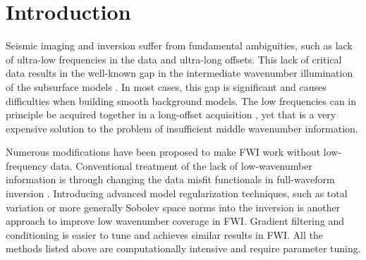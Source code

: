 \documentclass[paper,twocolomn]{geophysics}
\begin{document}
	






\section{Introduction}
Seismic imaging and inversion suffer from fundamental ambiguities, such as lack of ultra-low frequencies in the data and ultra-long offsets. This lack of critical data results in the well-known gap in the intermediate wavenumber illumination of the subsurface models \citep{claerbout1985, mora1989, sirgue2004, alkhalifahFullmodelWavenumberInversion2016, kazei2016, kazei2018, yao2019extraction}. In most cases, this gap is significant and causes difficulties when building smooth background models. The low frequencies can in principle be acquired together in a long-offset acquisition \citep[e.g.][]{fons2013}, yet that is a very expensive solution to the problem of insufficient middle wavenumber information.


Numerous modifications have been proposed to make FWI work without low-frequency data. %
Conventional treatment of the lack of low-wavenumber information is through changing the data misfit functionals in full-waveform inversion \citep[e.g.][]{luo1991wave, bozdag2011, choi2012, leeuwen2013, sun2019robust}.
Introducing advanced model regularization techniques, such as total variation or more generally Sobolev space norms \citep[e.g.][]{esserTotalvariationRegularizationStrategies2016, kazeiSaltbodyInversionMinimum2017, kalita2019regularized, skopintseva2019regularization} into the inversion is another approach to improve low wavenumber coverage in FWI.
Gradient filtering and conditioning \citep{ravaut2004multiscale, alkhalifahFullmodelWavenumberInversion2016, kazei2016, ovcharenko2018, ruan2018global} is easier to tune and achieves similar results in FWI. All the methods listed above are computationally intensive and require parameter tuning.
\end{document}
